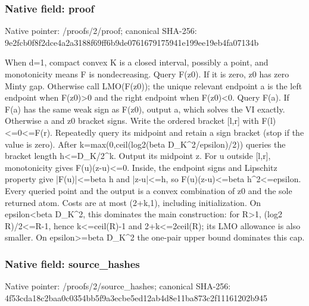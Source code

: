 \documentclass[10pt,a4paper]{article}
\begin{document}
\subsubsection{Native field: proof}
Native pointer: /proofs/2/proof; canonical SHA-256: 9e2fcb0f8f2dce4a2a3188f69ff6b9de0761679175941e199ee19eb4fa07134b

\begingroup\raggedright\sloppy When d=\allowbreak{}1,\allowbreak{} compact convex K is a closed interval,\allowbreak{} possibly a point,\allowbreak{} and monotonicity means F is nondecreasing. Query F(z0). If it is zero,\allowbreak{} z0 has zero Minty gap. Otherwise call LMO(F(z0));\allowbreak{} the unique relevant endpoint a is the left endpoint when F(z0)>0 and the right endpoint when F(z0)<0. Query F(a). If F(a) has the same weak sign as F(z0),\allowbreak{} output a,\allowbreak{} which solves the VI exactly. Otherwise a and z0 bracket signs. Write the ordered bracket [l,\allowbreak{}r] with F(l)<=\allowbreak{}0<=\allowbreak{}F(r). Repeatedly query its midpoint and retain a sign bracket (stop if the value is zero). After k=\allowbreak{}max(0,\allowbreak{}ceil(log2(beta D\_\allowbreak{}K\textasciicircum{}2/\allowbreak{}epsilon)/\allowbreak{}2)) queries the bracket length h<=\allowbreak{}D\_\allowbreak{}K/\allowbreak{}2\textasciicircum{}k. Output its midpoint z. For u outside [l,\allowbreak{}r],\allowbreak{} monotonicity gives F(u)(z-u)<=\allowbreak{}0. Inside,\allowbreak{} the endpoint signs and Lipschitz property give |F(u)|<=\allowbreak{}beta h and |z-u|<=\allowbreak{}h,\allowbreak{} so F(u)(z-u)<=\allowbreak{}beta h\textasciicircum{}2<=\allowbreak{}epsilon. Every queried point and the output is a convex combination of z0 and the sole returned atom. Costs are at most (2+k,\allowbreak{}1),\allowbreak{} including initialization. On epsilon<beta D\_\allowbreak{}K\textasciicircum{}2,\allowbreak{} this dominates the main construction:\allowbreak{} for R>1,\allowbreak{} (log2 R)/\allowbreak{}2<=\allowbreak{}R-1,\allowbreak{} hence k<=\allowbreak{}ceil(R)-1 and 2+k<=\allowbreak{}2ceil(R);\allowbreak{} its LMO allowance is also smaller. On epsilon>=\allowbreak{}beta D\_\allowbreak{}K\textasciicircum{}2 the one-pair upper bound dominates this cap.\par\endgroup

\subsubsection{Native field: source\_\allowbreak{}hashes}
Native pointer: /proofs/2/source\_\allowbreak{}hashes; canonical SHA-256: 4f53cda18c2baa0c0354bb5f9a3ecbe5ed12ab4d8e11ba873c2f11161202b945
\end{document}
